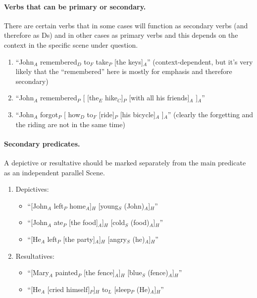 \documentclass[11pt]{article}
\newcommand{\be}{\begin{enumerate}}
\newcommand{\ee}{\end{enumerate}}
\newcommand{\orig}[1]{{\color{red} {#1}}}
\begin{document}
\paragraph{Verbs that can be primary or secondary.} 
There are certain verbs that in some cases will function as secondary verbs (and therefore as Ds) and in other cases as primary verbs and this depends on the context in the specific scene under question.
\be
\item
``John$_A$ remembered$_D$ to$_F$ take$_P$ [the keys]$_A$'' (context-dependent, but it's very likely that the ``remembered'' here is mostly for emphasis and therefore secondary)
\item
``John$_A$ remembered$_P$ [ [the$_E$ hike$_C$]$_P$ [with all his friends]$_A$ ]$_A$''
\item
``John$_A$ forgot$_P$ [ how$_D$ to$_F$ [ride]$_P$ [his bicycle]$_A$ ]$_A$'' (clearly the forgetting and the riding are not in the same time)
\ee

\paragraph{Secondary predicates.} A depictive or resultative should be marked separately from the main predicate as an independent parallel Scene.

\begin {enumerate}
\item 
Depictives: 

\begin{itemize}
\item
``[John$_A$ left$_P$ home$_A$]$_H$ [young$_S$ (John)$_A$]$_H$''
\item 
``[John$_A$ ate$_P$ [the food]$_A$]$_H$ [cold$_S$ (food)$_A$]$_H$''
\item
``[He$_A$ left$_P$ [the party]$_A$]$_H$ [angry$_S$ (he)$_A$]$_H$''
\end{itemize}

\item
Resultatives: 

\begin {itemize} 
\item
``[Mary$_A$ painted$_P$ [the fence]$_A$]$_H$ [blue$_S$ (fence)$_A$]$_H$''
\item
``[He$_A$ [cried himself]$_P$]$_H$ to$_L$ [sleep$_P$ (He)$_A$]$_H$''
\end {itemize} 
\end {enumerate}
\end{document}
